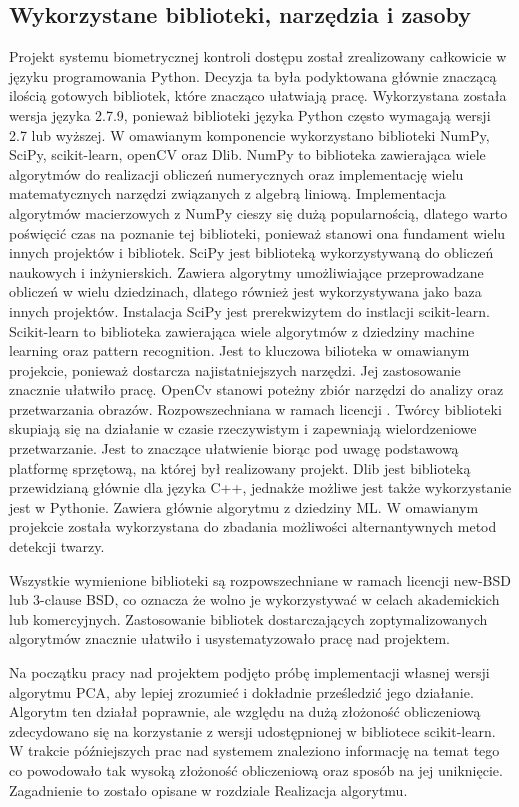 \documentclass[oneside, eng]{mgr}
\begin{document}
\subsection{Wykorzystane biblioteki, narzędzia i zasoby}
Projekt systemu biometrycznej kontroli dostępu został zrealizowany całkowicie w języku programowania Python. Decyzja ta była podyktowana głównie znaczącą ilością gotowych bibliotek, które znacząco ułatwiają pracę. Wykorzystana została wersja języka 2.7.9, ponieważ biblioteki języka Python często wymagają wersji 2.7 lub wyższej. W omawianym komponencie wykorzystano biblioteki NumPy, SciPy, scikit-learn, openCV oraz Dlib. 
NumPy to biblioteka zawierająca wiele algorytmów do realizacji obliczeń numerycznych oraz implementację wielu matematycznych narzędzi związanych z algebrą liniową. Implementacja algorytmów macierzowych z NumPy cieszy się dużą popularnością, dlatego warto poświęcić czas na poznanie tej biblioteki, ponieważ stanowi ona fundament wielu innych projektów i bibliotek.
SciPy jest biblioteką wykorzystywaną do obliczeń naukowych i inżynierskich. Zawiera algorytmy umożliwiające przeprowadzane obliczeń w wielu dziedzinach, dlatego również jest wykorzystywana jako baza innych projektów.
Instalacja SciPy jest prerekwizytem do instlacji scikit-learn. Scikit-learn to biblioteka zawierająca wiele algorytmów z dziedziny machine learning oraz pattern recognition. Jest to kluczowa bilioteka w omawianym projekcie, ponieważ dostarcza najistatniejszych narzędzi. Jej zastosowanie znacznie ułatwiło pracę.
OpenCv stanowi poteżny zbiór narzędzi do analizy oraz przetwarzania obrazów. Rozpowszechniana w ramach licencji . Twórcy biblioteki skupiają się na działanie w czasie rzeczywistym i zapewniają wielordzeniowe przetwarzanie. Jest to znaczące ułatwienie biorąc pod uwagę podstawową platformę sprzętową, na której był realizowany projekt. 
Dlib jest biblioteką przewidzianą głównie dla języka C++, jednakże możliwe jest także wykorzystanie jest w Pythonie. Zawiera głównie algorytmu z dziedziny ML. W omawianym projekcie została wykorzystana do zbadania możliwości alternantywnych metod detekcji twarzy.

Wszystkie wymienione biblioteki są rozpowszechniane w ramach licencji new-BSD lub 3-clause BSD, co oznacza że wolno je wykorzystywać w celach akademickich lub komercyjnych. Zastosowanie bibliotek dostarczających zoptymalizowanych algorytmów znacznie ułatwiło i usystematyzowało pracę nad projektem.

Na początku pracy nad projektem podjęto próbę implementacji własnej wersji algorytmu PCA, aby lepiej zrozumieć i dokładnie prześledzić jego działanie. Algorytm ten działał poprawnie, ale względu na dużą złożoność obliczeniową zdecydowano się na korzystanie z wersji udostępnionej w bibliotece scikit-learn. W trakcie późniejszych prac nad systemem znaleziono informację na temat tego co powodowało tak wysoką złożoność obliczeniową oraz sposób na jej uniknięcie. Zagadnienie to zostało opisane w rozdziale Realizacja algorytmu.
\end{document}
